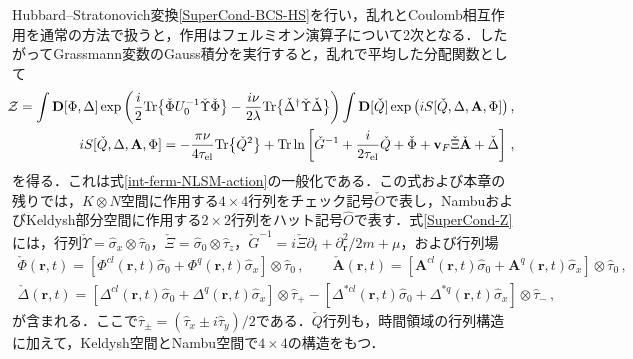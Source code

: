 \documentclass[a4paper,11pt]{ltjsarticle}
\def\Tr{\mathrm{Tr}}
\def\D{\mathbf{D}}
\def\rt{(\mathbf{r},t)}
\def\tauel{\tau_{\mathrm{el}}}
\begin{document}
Hubbard--Stratonovich変換\eqref{SuperCond-BCS-HS}を行い，乱れとCoulomb相互作用を通常の方法で扱うと，作用はフェルミオン演算子について2次となる．したがってGrassmann変数のGauss積分を実行すると，乱れで平均した分配関数として
\begin{eqnarray}\label{SuperCond-Z}
&&\hskip-.5cm
\mathcal{Z}=\int\D[\Phi,\Delta]\exp\left(\frac{i}{2}\Tr\big\{\check{\Phi}
U^{-1}_{0}\check{\Upsilon}\check{\Phi}\big\}-
\frac{i\nu}{2\lambda}\Tr\big\{\check{\Delta}^{\dag}
\check{\Upsilon}\check{\Delta}\big\}\right)
\int\D[\check Q]\exp\big(iS[\check Q,\Delta,\mathbf{A},\Phi]\big)\,,\nonumber\\
&&\hskip-.5cm
 iS[\check{Q},\Delta,\mathbf{A},\Phi]=-\frac{\pi\nu}{4\tauel}
\Tr\big\{\check{Q}^{2}\big\}+\Tr\ln\left[\check{G}^{-1}+
\frac{i}{2\tauel}\check{Q}+\check{\Phi}+
\mathbf{v}_{F}\check{\Xi}\check{\mathbf{A}}+\check{\Delta}\right]\,,
\end{eqnarray}
を得る．これは式\eqref{int-ferm-NLSM-action}の一般化である．この式および本章の残りでは，$K\otimes N$空間に作用する$4\times4$行列をチェック記号$\check{O}$で表し，NambuおよびKeldysh部分空間に作用する$2\times2$行列をハット記号$\hat{O}$で表す．式\eqref{SuperCond-Z}には，行列$\check{\Upsilon}=\hat{\sigma}_{x}\otimes\hat{\tau}_{0}$，$\check{\Xi}=\hat{\sigma}_{0}\otimes\hat{\tau}_{z}$，$\check{G}^{-1}=i\check{\Xi}\partial_{t}+\partial^{2}_{\mathbf{r}}/2m+\mu$，および行列場
\begin{eqnarray}\label{SuperCond-A-Phi-Delta}
\check{\Phi}\rt=[\Phi^{cl}\rt\hat{\sigma}_{0}+\Phi^{q}\rt\hat{\sigma}_{x}]\otimes\hat{\tau}_{0}\,,\qquad
\check{\mathbf{A}}\rt=[\mathbf{A}^{cl}\rt\hat{\sigma}_{0}+\mathbf{A}^{q}\rt\hat{\sigma}_{x}]
\otimes\hat{\tau}_{0}\,,
\nonumber\\
\check{\Delta}\rt=[\Delta^{cl}\rt\hat{\sigma}_{0}+\Delta^{q}\rt\hat{\sigma}_{x}]\otimes\hat{\tau}_{+}-
[\Delta^{*cl}\rt\hat{\sigma}_{0}+\Delta^{*q}\rt\hat{\sigma}_{x}]\otimes\hat{\tau}_{-}\,,
\end{eqnarray}
が含まれる．ここで$\hat{\tau}_{\pm}=(\hat{\tau}_{x}\pm i\hat{\tau}_{y})/2$である．$\check{Q}$行列も，時間領域の行列構造に加えて，Keldysh空間とNambu空間で$4\times4$の構造をもつ．
\end{document}
